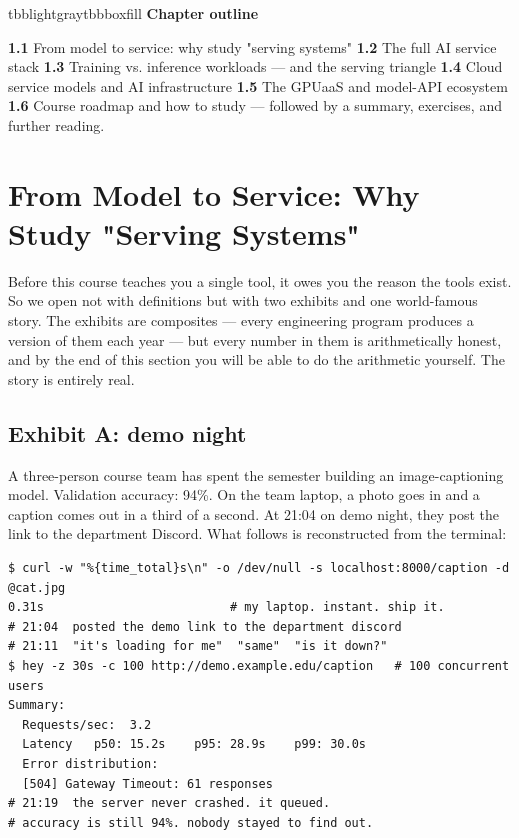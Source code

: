 \vspace{5.0pt}

\begin{calloutbox}{tbblightgray}{tbbboxfill}
{\normalsize\bfseries\color{tbbink}Chapter outline}\par\vspace{3pt}
\textbf{1.1} From model to service: why study "serving systems"    \textbf{1.2} The full AI service stack    \textbf{1.3} Training vs. inference workloads — and the serving triangle    \textbf{1.4} Cloud service models and AI infrastructure    \textbf{1.5} The GPUaaS and model-API ecosystem    \textbf{1.6} Course roadmap and how to study — followed by a summary, exercises, and further reading.
\end{calloutbox}

\section{From Model to Service: Why Study "Serving Systems"}

Before this course teaches you a single tool, it owes you the reason the tools exist. So we open not with definitions but with two exhibits and one world-famous story. The exhibits are composites — every engineering program produces a version of them each year — but every number in them is arithmetically honest, and by the end of this section you will be able to do the arithmetic yourself. The story is entirely real.

\subsection*{Exhibit A: demo night}

A three-person course team has spent the semester building an image-captioning model. Validation accuracy: 94\%. On the team laptop, a photo goes in and a caption comes out in a third of a second. At 21:04 on demo night, they post the link to the department Discord. What follows is reconstructed from the terminal:

\begin{terminalbox}
\begin{Verbatim}[breaklines=true,breakanywhere=true,fontsize=\small,formatcom=\color{tbbtermfg},codes=\tbbcodeactive]
$ curl -w "%{time_total}s\n" -o /dev/null -s localhost:8000/caption -d @cat.jpg
0.31s                          # my laptop. instant. ship it.
# 21:04  posted the demo link to the department discord
# 21:11  "it's loading for me"  "same"  "is it down?"
$ hey -z 30s -c 100 http://demo.example.edu/caption   # 100 concurrent users
Summary:
  Requests/sec:  3.2
  Latency   p50: 15.2s    p95: 28.9s    p99: 30.0s
  Error distribution:
  [504] Gateway Timeout: 61 responses
# 21:19  the server never crashed. it queued.
# accuracy is still 94%. nobody stayed to find out.
\end{Verbatim}
\end{terminalbox}

